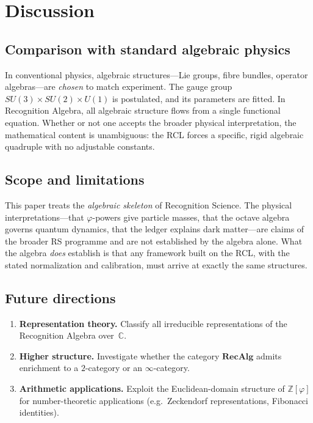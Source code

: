 \documentclass[11pt,a4paper]{article}
\theoremstyle{plain}
\theoremstyle{definition}
\theoremstyle{remark}
\newcommand{\phig}{\varphi}
\newcommand{\ZZ}{\mathbb{Z}}
\newcommand{\CC}{\mathbb{C}}
\begin{document}
\section{Discussion}\label{sec:discussion}

\subsection{Comparison with standard algebraic physics}

In conventional physics, algebraic structures---Lie groups, fibre
bundles, operator algebras---are \emph{chosen} to match experiment.
The gauge group $SU(3)\times SU(2)\times U(1)$ is postulated, and its
parameters are fitted.  In Recognition Algebra, all algebraic structure
flows from a single functional equation.  Whether or not one accepts
the broader physical interpretation, the mathematical content is
unambiguous: the RCL forces a specific, rigid algebraic
quadruple with no adjustable constants.

\subsection{Scope and limitations}

This paper treats the \emph{algebraic skeleton} of Recognition Science.
The physical interpretations---that $\phig$-powers give particle
masses, that the octave algebra governs quantum dynamics, that the
ledger explains dark matter---are claims of the broader RS programme
and are not established by the algebra alone.  What the algebra
\emph{does} establish is that any framework built on the RCL, with the
stated normalization and calibration, must arrive at exactly the same
structures.

\subsection{Future directions}

\begin{enumerate}[nosep]
\item \textbf{Representation theory.}  Classify all irreducible
  representations of the Recognition Algebra over~$\CC$.
\item \textbf{Higher structure.}  Investigate whether the category
  $\mathbf{RecAlg}$ admits enrichment to a $2$-category or an
  $\infty$-category.
\item \textbf{Arithmetic applications.}  Exploit the Euclidean-domain
  structure of $\ZZ[\phig]$ for number-theoretic applications
  (e.g.\ Zeckendorf representations, Fibonacci identities).
\end{enumerate}
\end{document}
